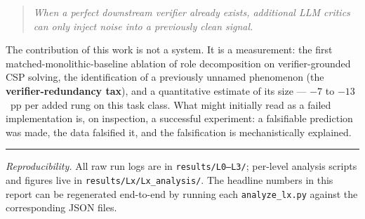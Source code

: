 \documentclass[11pt,a4paper]{article}
\begin{document}
\begin{quote}\itshape
When a perfect downstream verifier already exists, additional LLM critics
can only inject noise into a previously clean signal.
\end{quote}

The contribution of this work is not a system. It is a measurement: the
first matched-monolithic-baseline ablation of role decomposition on
verifier-grounded CSP solving, the identification of a previously unnamed
phenomenon (the \textbf{verifier-redundancy tax}), and a quantitative
estimate of its size --- $-7$ to $-13$~pp per added rung on this task class.
What might initially read as a failed implementation is, on inspection, a
successful experiment: a falsifiable prediction was made, the data
falsified it, and the falsification is mechanistically explained.

\vspace{4pt}\hrule\vspace{4pt}
\small\textit{Reproducibility.} All raw run logs are in
\texttt{results/L0--L3/}; per-level analysis scripts and figures live in
\texttt{results/Lx/Lx\_analysis/}. The headline numbers in this report can
be regenerated end-to-end by running each \texttt{analyze\_lx.py} against
the corresponding JSON files.
\end{document}
